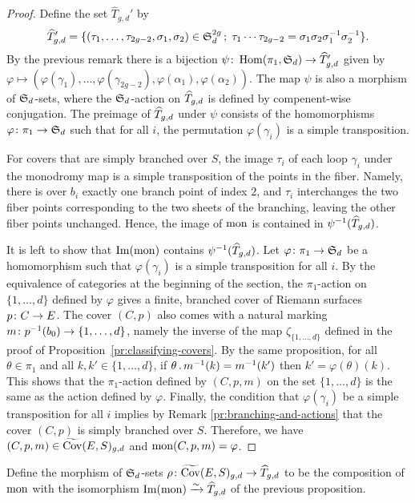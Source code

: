 \begin{proof}
 Define the set $\widehat{T}_{g,d}'$ by
 \[\widehat{T}_{g,d}' = \{(\tau_1,\dotsc,\tau_{2g-2},\sigma_1,\sigma_2)\in \operatorname{\mathfrak{S}}_d^{2g} \,;\; \tau_1\dotsm\tau_{2g-2}=\sigma_1\sigma_2\sigma_1^{-1}\sigma_2^{-1}\}.\]
 By the previous remark there is a bijection $\psi\colon\operatorname{Hom}(\pi_1,\operatorname{\mathfrak{S}}_d)\to \widehat{T}_{g,d}'$ given by $\varphi\mapsto(\varphi(\gamma_1),\dotsc,\varphi(\gamma_{2g-2}),\varphi(\alpha_1),\varphi(\alpha_2))$. The map $\psi$ is also a morphism of \mbox{$\operatorname{\mathfrak{S}}_d$-sets}, where the $\operatorname{\mathfrak{S}}_d$-action on $\widehat{T}_{g,d}$ is defined by compenent-wise conjugation. The preimage of $\widehat{T}_{g,d}$ under $\psi$ consists of the homomorphisms $\varphi\colon\pi_1\to\operatorname{\mathfrak{S}}_d$ such that for all $i$, the permutation $\varphi(\gamma_i)$ is a simple transposition.
 
 For covers that are simply branched over $S$, the image $\tau_i$ of each loop $\gamma_i$ under the monodromy map is a simple transposition of the points in the fiber. Namely, there is over $b_i$ exactly one branch point of index $2$, and $\tau_i$ interchanges the two fiber points corresponding to the two sheets of the branching, leaving the other fiber points unchanged. Hence, the image of $\operatorname{mon}$ is contained in $\psi^{-1}(\widehat{T}_{g,d})$.
 
 It is left to show that $\operatorname{Im}(\operatorname{mon})$ contains $\psi^{-1}(\widehat{T}_{g,d})$. Let $\varphi\colon\pi_1\to\operatorname{\mathfrak{S}}_d$ be a homomorphism such that $\varphi(\gamma_i)$ is a simple transposition for all $i$. By the equivalence of categories at the beginning of the section, the $\pi_1$-action on $\{1,\dotsc,d\}$ defined by $\varphi$ gives a finite, branched cover of Riemann surfaces $p\colon C\to E$. The cover $(C,p)$ also comes with a natural marking $m\colon p^{-1}(b_0)\to\{1,\dotsc,d\}$, namely the inverse of the map $\zeta_{\{1,\dotsc,d\}}$ defined in the proof of Proposition~\ref{pr:classifying-covers}. By the same proposition, for all $\theta\in\pi_1$ and all $k,k'\in\{1,\dotsc,d\}$, if $\theta\,.\, m^{-1}(k)=m^{-1}(k')$ then $k'=\varphi(\theta)(k)$. This shows that the $\pi_1$-action defined by $(C,p,m)$ on the set $\{1,\dotsc,d\}$ is the same as the action defined by $\varphi$. Finally, the condition that $\varphi(\gamma_i)$ be a simple transposition for all $i$ implies by Remark \ref{pr:branching-and-actions} that the cover $(C,p)$ is simply branched over $S$. Therefore, we have $(C,p,m)\in\widetilde{\operatorname{Cov}}(E,S)_{g,d}$ and $\operatorname{mon}(C,p,m)=\varphi$.
\end{proof}

Define the morphism of $\operatorname{\mathfrak{S}}_d$-sets $\rho\colon \widetilde{\operatorname{Cov}}(E,S)_{g,d} \to \widehat{T}_{g,d}$ to be the composition of $\operatorname{mon}$ with the isomorphism $\operatorname{Im}(\operatorname{mon})\xrightarrow{\sim}\widehat{T}_{g,d}$ of the previous proposition.

